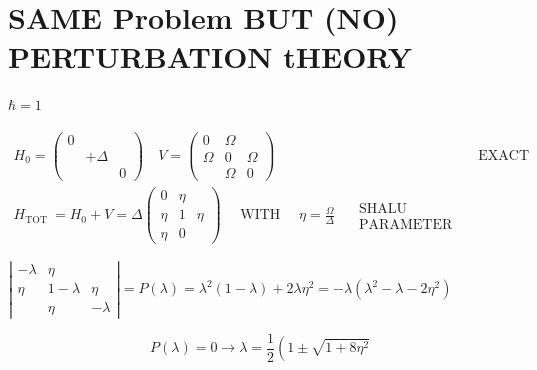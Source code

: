 \documentclass[10pt]{article}
\begin{document}
\section*{SAME Problem BUT (NO) PERTURBATION tHEORY}
$\hbar=1$

$$
\begin{array}{ll}
H_{0}=\left(\begin{array}{ccc}
0 & & \\
& +\Delta & \\
& & 0
\end{array}\right) \quad V=\left(\begin{array}{ccc}
0 & \Omega & \\
\Omega & 0 & \Omega \\
& \Omega & 0
\end{array}\right) & \text { EXACT } \\
H_{\text {TOT }}=H_{0}+V=\Delta\left(\begin{array}{ccc}
0 & \eta & \\
\eta & 1 & \eta \\
\eta & 0
\end{array}\right) \quad \text { WITH } \quad \eta=\frac{\Omega}{\Delta} \quad \begin{array}{c}
\text { SHALU } \\
\text { PARAMETER }
\end{array}
\end{array}
$$

$\left|\begin{array}{ccc}-\lambda & \eta & \\ \eta & 1-\lambda & \eta \\ & \eta & -\lambda\end{array}\right|=P(\lambda)=\lambda^{2}(1-\lambda)+2 \lambda \eta^{2}=-\lambda\left(\lambda^{2}-\lambda-2 \eta^{2}\right)$

$$
P(\lambda)=0 \rightarrow \lambda=\frac{1}{2}\left(1 \pm \sqrt{1+8 \eta^{2}}\right.
$$
\end{document}

